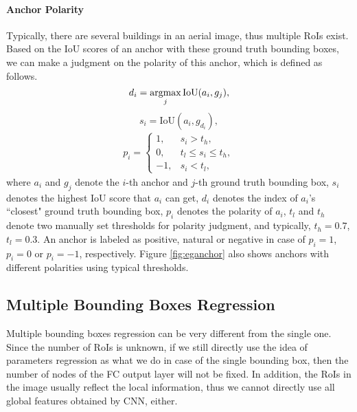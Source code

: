 

\paragraph{Anchor Polarity}
Typically, there are several buildings in an aerial image, thus multiple RoIs exist. Based on the IoU scores of an anchor with these ground truth bounding boxes, we can make a judgment on the polarity of this anchor, which is defined as follows.
\begin{equation}
	d_i = \operatorname*{argmax}_{j} \text{IoU}(a_i, g_j),
\end{equation}
\begin{equation}
	s_i = \text{IoU}(a_i, g_{d_i}),
\end{equation}
\begin{equation}
\begin{aligned}
	p_i = \begin{cases}
		1, & s_i > t_h, \\
		0, & t_l \leqslant s_i \leqslant t_h,\\
		-1, & s_i < t_l,
	\end{cases}
\end{aligned}
\end{equation}
where $a_i$ and $g_j$ denote the $i$-th anchor and $j$-th ground truth bounding box, $s_i$ denotes the highest IoU score that $a_i$ can get, $d_i$ denotes the index of $a_i$'s ``closest" ground truth bounding box, $p_i$ denotes the polarity of $a_i$, $t_l$ and $t_h$ denote two manually set thresholds for polarity judgment, and typically, $t_h = 0.7$, $t_l = 0.3$. An anchor is labeled as positive, natural or negative in case of $p_i = 1$, $p_i = 0$ or $p_i = -1$, respectively. Figure \ref{fig:eganchor} also shows anchors with different polarities using typical thresholds.

\subsection{Multiple Bounding Boxes Regression}\label{mulbboxreg}
Multiple bounding boxes regression can be very different from the single one. Since the number of RoIs is unknown, if we still directly use the idea of parameters regression as what we do in case of the single bounding box, then the number of nodes of the FC output layer will not be fixed. In addition, the RoIs in the image usually reflect the local information, thus we cannot directly use all global features obtained by CNN, either.

